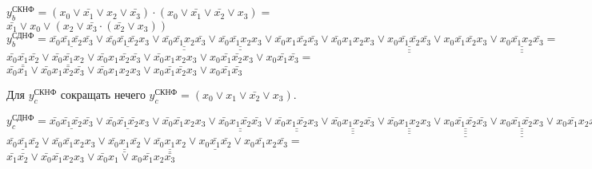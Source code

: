 \documentclass{bmstu}
\begin{document}
	\begin{center}
		$y^{\text{СКНФ}}_b = (x_0 \vee \bar{x_1} \vee x_2 \vee \bar{x_3}) \cdot 
							 (x_0 \vee \bar{x_1} \vee \bar{x_2} \vee x_3) = $ \\
		$\bar{x_1} \vee x_0 \vee (x_2 \vee \bar{x_3} \cdot 
							 (\bar{x_2} \vee x_3))$
		\\ 
		$y^{\text{СДНФ}}_b = \underline{\bar{x_0} \bar{x_1} \bar{x_2} \bar{x_3}} \vee 
							 \underline{\bar{x_0} \bar{x_1} \bar{x_2} x_3} \vee
							 \underline{\underline{\bar{x_0} \bar{x_1} x_2 \bar{x_3}}} \vee 
							 \underline{\underline{\bar{x_0} \bar{x_1} x_2 x_3}} \vee
							 \bar{x_0} x_1 \bar{x_2} \bar{x_3} \vee 
							 \bar{x_0} x_1 x_2 x_3 \vee 
							 \underline{\underline{\underline{x_0 \bar{x_1} \bar{x_2} \bar{x_3}}}} \vee 
							 x_0 \bar{x_1} \bar{x_2} x_3 \vee 
							 \underline{\underline{\underline{x_0 \bar{x_1} x_2 \bar{x_3}}}} = $ \\
		$\underline{\bar{x_0} \bar{x_1} \bar{x_2}} \vee 
		 \underline{\bar{x_0} \bar{x_1} x_2} \vee
		 \bar{x_0} x_1 \bar{x_2} \bar{x_3} \vee 
		 \bar{x_0} x_1 x_2 x_3 \vee 
		 x_0 \bar{x_1} \bar{x_2} x_3 \vee
		 x_0 \bar{x_1} \bar{x_3} = $ \\
		$\bar{x_0} \bar{x_1} \vee
		 \bar{x_0} x_1 \bar{x_2} \bar{x_3} \vee 
		 \bar{x_0} x_1 x_2 x_3 \vee 
		 x_0 \bar{x_1} \bar{x_2} x_3 \vee
		 x_0 \bar{x_1} \bar{x_3} $ 		
	\end{center} 


	Для $y^{\text{СКНФ}}_c$ сокращать нечего $y^{\text{СКНФ}}_c = (x_0 \vee x_1 \vee \bar{x_2} \vee x_3)$.
	\begin{center}   
		$y^{\text{СДНФ}}_c = \underline{\bar{x_0} \bar{x_1} \bar{x_2} \bar{x_3}} \vee
							 \underline{\bar{x_0} \bar{x_1} \bar{x_2} x_3} \vee 
							 \bar{x_0} \bar{x_1} x_2 x_3 \vee
							 \underline{\underline{\bar{x_0} x_1 \bar{x_2} \bar{x_3}}} \vee 
							 \underline{\underline{\bar{x_0} x_1 \bar{x_2} x_3}} \vee 
							 \underline{\underline{\underline{\bar{x_0} x_1 x_2 \bar{x_3}}}} \vee 
							 \underline{\underline{\underline{\bar{x_0} x_1 x_2 x_3}}} \vee 
							 \underline{\underline{\underline{\underline{x_0 \bar{x_1} \bar{x_2} \bar{x_3}}}}} \vee 
							 \underline{\underline{\underline{\underline{x_0 \bar{x_1} \bar{x_2} x_3}}}} \vee 
							 x_0 \bar{x_1} x_2 \bar{x_3} = $ \\
		$\underline{\bar{x_0} \bar{x_1} \bar{x_2}} \vee
		 \bar{x_0} \bar{x_1} x_2 x_3 \vee
		 \underline{\underline{\bar{x_0} x_1 \bar{x_2}}} \vee
		 \underline{\underline{\bar{x_0} x_1 x_2}} \vee
		 \underline{x_0 \bar{x_1} \bar{x_2}} \vee
		 x_0 \bar{x_1} x_2 \bar{x_3} = $ \\
		$\bar{x_1} \bar{x_2} \vee
		 \bar{x_0} \bar{x_1} x_2 x_3 \vee
		 \bar{x_0} x_1 \vee
		 x_0 \bar{x_1} x_2 \bar{x_3}$
	\end{center}       
\end{document}
